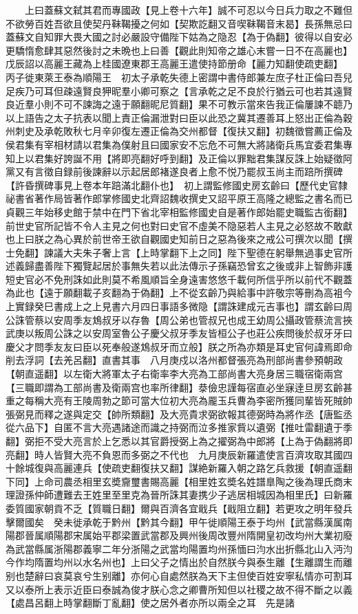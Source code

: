 　　上曰蓋蘇文弑其君而專國政【見上卷十六年】誠不可忍以今日兵力取之不難但不欲勞百姓吾欲且使契丹靺鞨擾之何如【契欺訖翻又音喫靺鞨音末曷】長孫無忌曰蓋蘇文自知罪大畏大國之討必嚴設守備陛下姑為之隐忍【為于偽翻】彼得以自安必更驕惰愈肆其惡然後討之未晩也上曰善【觀此則知帝之雄心末嘗一日不在高麗也】戊辰詔以高麗王藏為上桂國遼東郡王高麗王遣使持節册命【麗力知翻使疏吏翻】　丙子徙東萊王泰為順陽王　初太子承乾失德上密謂中書侍郎兼左庶子杜正倫曰吾兒足疾乃可耳但疎遠賢良狎昵羣小卿可察之【言承乾之足不良於行猶云可也若其遠賢良近羣小則不可不諫誨之遠于願翻昵尼質翻】果不可教示當來告我正倫屢諫不聼乃以上語告之太子抗表以聞上責正倫漏泄對曰臣以此恐之冀其遷善耳上怒出正倫為穀州刺史及承乾敗秋七月辛卯復左遷正倫為交州都督【復扶又翻】初魏徵嘗薦正倫及侯君集有宰相材請以君集為僕射且曰國家安不忘危不可無大將諸衛兵馬宜委君集專知上以君集好誇誕不用【將即亮翻好呼到翻】及正倫以罪黜君集謀反誅上始疑徵阿黨又有言徵自録前後諫辭以示起居郎褚遂良者上愈不悦乃罷叔玉尚主而踣所撰碑【許昏撰碑事見上卷本年踣滿北翻仆也】　初上謂監修國史房玄齡曰【歷代史官隸祕書省著作局皆著作郎掌修國史北齊詔魏收撰史又詔平原王高隆之總監之書名而已貞觀三年始移史館于禁中在門下省北宰相監修國史自是著作郎始罷史職監古銜翻】前世史官所記皆不令人主見之何也對曰史官不虛美不隐惡若人主見之必怒故不敢獻也上曰朕之為心異於前世帝王欲自觀國史知前日之惡為後來之戒公可撰次以聞【撰士免翻】諫議大夫朱子奢上言【上時掌翻下上之同】陛下聖德在躬舉無過事史官所述義歸盡善陛下獨覽起居於事無失若以此法傳示子孫竊恐曾玄之後或非上智飾非護短史官必不免刑誅如此則莫不希風順旨全身遠害悠悠千載何所信乎所以前代不觀蓋為此也【遠于願翻載子亥翻為于偽翻】上不從玄齡乃與給事中許敬宗等刪為高袓今上實録癸巳書成上之上見書六月四日事語多微隐【謂誅建成元吉事也】謂玄齡曰周公誅管蔡以安周季友鴆叔牙以存魯【周公弟也管叔兄也成王幼周公攝政管蔡流言挾武庚以叛周公誅之以安周室魯公子慶父叔牙季友皆桓公子也莊公疾問後於叔牙牙曰慶父才問季友友曰臣以死奉般遂鴆叔牙而立般】朕之所為亦類是耳史官何諱焉即命削去浮詞【去羌呂翻】直書其事　八月庚戍以洛州都督張亮為刑部尚書參預朝政【朝直遥翻】以左衛大將軍太子右衛率李大亮為工部尚書大亮身居三職宿衛兩宫【三職即謂為工部尚書及衛兩宫也率所律翻】㳟儉忠謹每宿直必坐寐逹旦房玄齡甚重之每稱大亮有王陵周勃之節可當大位初大亮為龎玉兵曹為李密所獲同輩皆死賊帥張弼見而釋之遂與定交【帥所類翻】及大亮貴求弼欲報其德弼時為將作丞【唐監丞從六品下】自匿不言大亮遇諸途而識之持弼而泣多推家貲以遺弼【推吐雷翻遺于季翻】弼拒不受大亮言於上乞悉以其官爵授弼上為之擢弼為中郎將【上為于偽翻將即亮翻】時人皆賢大亮不負恩而多弼之不代也　九月庚辰新羅遣使言百濟攻取其國四十餘城復與高麗連兵【使疏吏翻復扶又翻】謀絶新羅入朝之路乞兵救援【朝直遥翻下同】上命司農丞相里玄奬齎璽書賜高麗【相里姓玄奬名姓譜臯陶之後為理氏商末理證孫仲師遭難去王姓里至里克為晉所誅其妻携少子逃居相城因為相里氏】曰新羅委質國家朝貢不乏【質職日翻】爾與百濟各宜戢兵【戢阻立翻】若更攻之明年發兵擊爾國矣　癸未徙承乾于黔州【黔其今翻】甲午徙順陽王泰于均州【武當縣漢属南陽郡晉属順陽郡宋属始平郡梁置武當郡及興州後周改豐州隋開皇初改均州大業初廢為武當縣属浙陽郡義寧二年分浙陽之武當均陽置均州孫愐曰汮水出折縣北山入沔汮今作均隋置均州以水名州也】上曰父子之情出於自然朕今與泰生離【生離謂生而離别也楚辭曰哀莫哀兮生别離】亦何心自處然朕為天下主但使百姓安寧私情亦可割耳又以泰所上表示近臣曰泰誠為俊才朕心念之卿曹所知但以社稷之故不得不斷之以義【處昌呂翻上時掌翻斷丁亂翻】使之居外者亦所以兩全之耳　先是諸